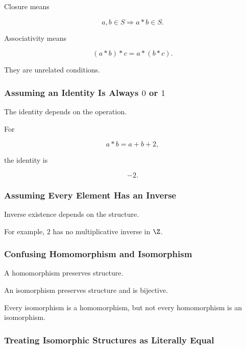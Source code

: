 Closure means

\[ a,b\in S\Longrightarrow a*b\in S. \]

Associativity means

\[ (a*b)*c=a*(b*c). \]

They are unrelated conditions.

\subsubsection{Assuming an Identity Is Always \(0\) or \(1\)}
\label{subsec:error-identity-zero-one}

The identity depends on the operation.

For

\[ a*b=a+b+2, \]

the identity is

\[ -2. \]

\subsubsection{Assuming Every Element Has an Inverse}
\label{subsec:error-every-element-inverse}

Inverse existence depends on the structure.

For example, \(2\) has no multiplicative inverse in \(\Z\).

\subsubsection{Confusing Homomorphism and Isomorphism}
\label{subsec:error-homomorphism-isomorphism}

A homomorphism preserves structure.

An isomorphism preserves structure and is bijective.

Every isomorphism is a homomorphism, but not every homomorphism is an
isomorphism.

\subsubsection{Treating Isomorphic Structures as Literally Equal}
\label{subsec:error-isomorphic-equal}

